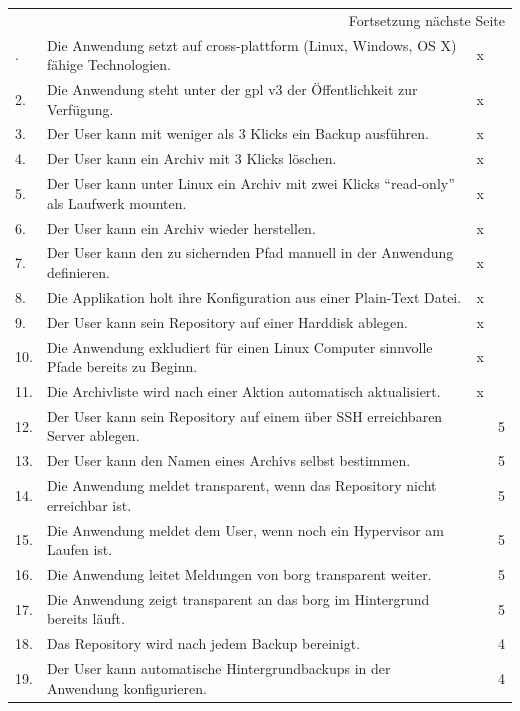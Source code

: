 \begin{longtable}{|p{1cm}|p{9cm}|p{1.5cm}|p{2cm}|}
\hline
\endhead
\hline\multicolumn{4}{r}{Fortsetzung nächste Seite} \\
\endfoot
\endlastfoot
\hline
1. & Die Anwendung setzt auf cross-plattform (Linux, Windows, OS X) fähige Technologien. & x & \\
\hline
2. & Die Anwendung steht unter der \gls{gpl} v3 der Öffentlichkeit zur Verfügung. & x & \\
\hline
3. & Der User kann mit weniger als 3 Klicks ein Backup ausführen. & x & \\
\hline
4. & Der User kann ein Archiv mit 3 Klicks löschen. & x & \\
\hline
5. & Der User kann unter Linux ein Archiv mit zwei Klicks "`read-only"' als Laufwerk mounten. & x & \\
\hline
6. & Der User kann ein Archiv wieder herstellen. & x & \\
\hline
7. & Der User kann den zu sichernden Pfad manuell in der Anwendung definieren. & x & \\
\hline
8. & Die Applikation holt ihre Konfiguration aus einer Plain-Text Datei. & x & \\
\hline
9. & Der User kann sein Repository auf einer Harddisk ablegen. & x & \\
\hline
10. & Die Anwendung exkludiert für einen Linux Computer sinnvolle Pfade bereits zu Beginn. & x & \\
\hline
11. & Die Archivliste wird nach einer Aktion automatisch aktualisiert. & x & \\
\hline
12. & Der User kann sein Repository auf einem über SSH erreichbaren Server ablegen. &  & 5\\
\hline
13. & Der User kann den Namen eines Archivs selbst bestimmen. &  & 5\\
\hline
14. & Die Anwendung meldet transparent, wenn das Repository nicht erreichbar ist. &  & 5\\
\hline
15. & Die Anwendung meldet dem User, wenn noch ein Hypervisor am Laufen ist. &  & 5\\
\hline
16. & Die Anwendung leitet Meldungen von \gls{borg} transparent weiter. &  & 5\\
\hline
17. & Die Anwendung zeigt transparent an das \gls{borg} im Hintergrund bereits läuft. &  & 5\\
\hline
18. & Das Repository wird nach jedem Backup bereinigt. &  & 4\\
\hline
19. & Der User kann automatische Hintergrundbackups in der Anwendung konfigurieren. &  & 4\\

\end{longtable}
